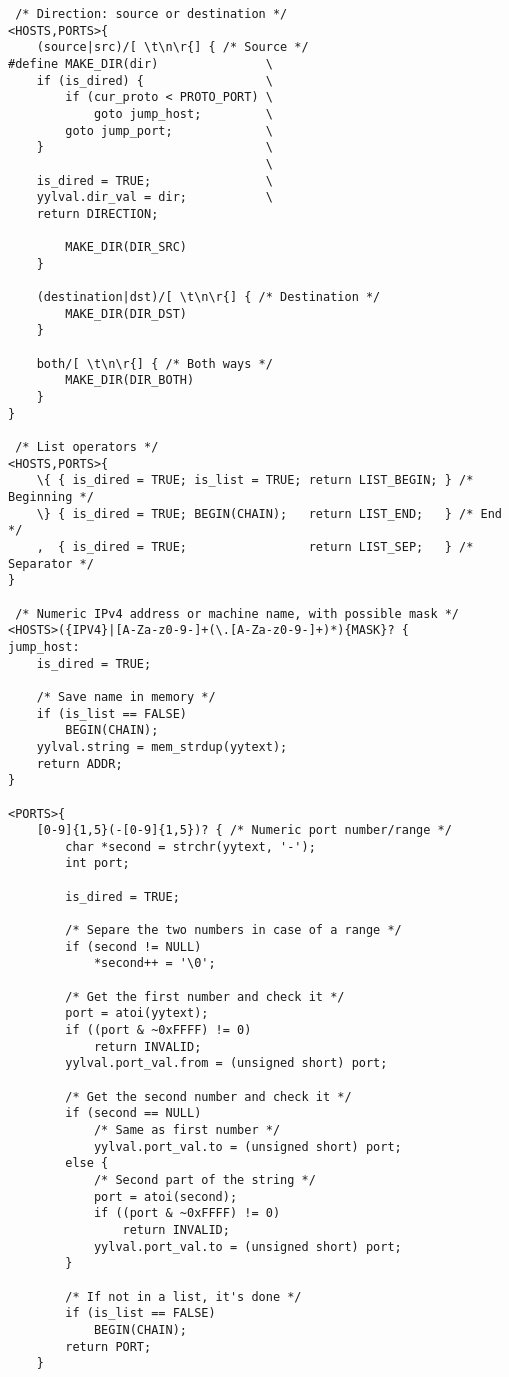 \documentclass[a4paper,landscape,twocolumn,11pt]{article}
\begin{document}
{\begin{verbatim}
 /* Direction: source or destination */
<HOSTS,PORTS>{
    (source|src)/[ \t\n\r{] { /* Source */
#define MAKE_DIR(dir)               \
    if (is_dired) {                 \
        if (cur_proto < PROTO_PORT) \
            goto jump_host;         \
        goto jump_port;             \
    }                               \
                                    \
    is_dired = TRUE;                \
    yylval.dir_val = dir;           \
    return DIRECTION;

        MAKE_DIR(DIR_SRC)
    }

    (destination|dst)/[ \t\n\r{] { /* Destination */
        MAKE_DIR(DIR_DST)
    }

    both/[ \t\n\r{] { /* Both ways */
        MAKE_DIR(DIR_BOTH)
    }
}

 /* List operators */
<HOSTS,PORTS>{
    \{ { is_dired = TRUE; is_list = TRUE; return LIST_BEGIN; } /* Beginning */
    \} { is_dired = TRUE; BEGIN(CHAIN);   return LIST_END;   } /* End       */
    ,  { is_dired = TRUE;                 return LIST_SEP;   } /* Separator */
}

 /* Numeric IPv4 address or machine name, with possible mask */
<HOSTS>({IPV4}|[A-Za-z0-9-]+(\.[A-Za-z0-9-]+)*){MASK}? {
jump_host:
    is_dired = TRUE;

    /* Save name in memory */
    if (is_list == FALSE)
        BEGIN(CHAIN);
    yylval.string = mem_strdup(yytext);
    return ADDR;
}

<PORTS>{
    [0-9]{1,5}(-[0-9]{1,5})? { /* Numeric port number/range */
        char *second = strchr(yytext, '-');
        int port;

        is_dired = TRUE;

        /* Separe the two numbers in case of a range */
        if (second != NULL)
            *second++ = '\0';

        /* Get the first number and check it */
        port = atoi(yytext);
        if ((port & ~0xFFFF) != 0)
            return INVALID;
        yylval.port_val.from = (unsigned short) port;

        /* Get the second number and check it */
        if (second == NULL)
            /* Same as first number */
            yylval.port_val.to = (unsigned short) port;
        else {
            /* Second part of the string */
            port = atoi(second);
            if ((port & ~0xFFFF) != 0)
                return INVALID;
            yylval.port_val.to = (unsigned short) port;
        }

        /* If not in a list, it's done */
        if (is_list == FALSE)
            BEGIN(CHAIN);
        return PORT;
    }


\end{verbatim}}
\end{document}
